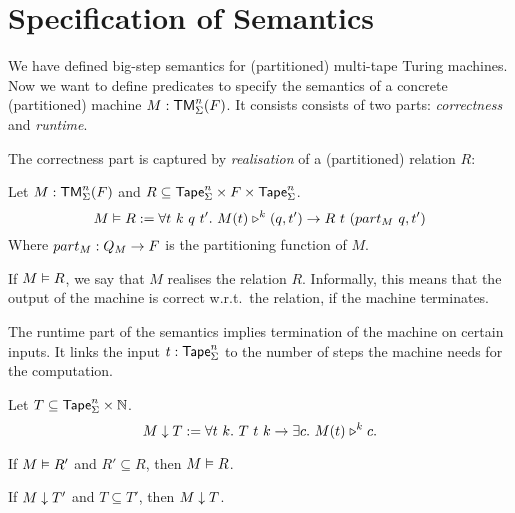 \section{Specification of Semantics}
\label{sec:spec_semantics}

We have defined big-step semantics for (partitioned) multi-tape Turing machines.  Now we want to define predicates to specify the semantics of a
concrete (partitioned) machine $M: \mathsf{TM}_\Sigma^n(F)$.  It consists consists of two parts: \emph{correctness} and \emph{runtime}.

The correctness part is captured by \emph{realisation} of a (partitioned) relation $R$:

\begin{definition}[Realisation][Realise]
  \label{def:realisation}
  Let $M:\mathsf{TM}_\Sigma^n(F)$ and $R \subseteq \mathsf{Tape}_\Sigma^n \times F \times \mathsf{Tape}_\Sigma^n$.
  \[
    M \mathrel{\vDash} R :=
    \forall t~k~q~t'.~M(t) \mathrel{\triangleright}^k (q, t') \rightarrow
    R~t~(part_M~q, t')
  \]
  Where $part_M : Q_M \rightarrow F$ is the partitioning function of $M$.
\end{definition}

If $M \mathrel{\vDash} R$, we say that $M$ realises the relation $R$.  Informally, this means that the output of the machine is correct w.r.t.\ the relation,
if the machine terminates.

The runtime part of the semantics implies termination of the machine on certain inputs.  It links the input $t:\mathsf{Tape}_\Sigma^n$ to the number of steps
the machine needs for the computation.

\begin{definition}
  \label{def:TerminatesIn}
  Let $T \subseteq \mathsf{Tape}_\Sigma^n \times \mathbb{N}$.
  \[
    M \mathrel{\downarrow} T :=
    \forall t~k.~T~t~k \rightarrow
    \exists c.~M (t) \mathrel{\triangleright}^k c.
  \]
\end{definition}


\begin{lemma}
  \label{lem:Realise_monotone}
  If $M \mathrel{\vDash} R'$ and $R' \subseteq R$, then $M \mathrel{\vDash} R$.
\end{lemma}

\begin{lemma}
  \label{lem:TerminatesIn_monotone}
  If $M \mathrel{\downarrow} T'$ and $T \subseteq T'$, then $M \mathrel{\downarrow} T$.
\end{lemma}

